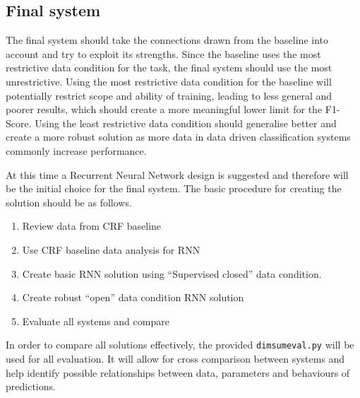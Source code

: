 \subsection{Final system}

The final system should take the connections drawn from the baseline into account and try to exploit its strengths. Since the baseline uses the most restrictive data condition for the task, the final system should use the most unrestrictive. Using the most restrictive data condition for the baseline will potentially restrict scope and ability of training, leading to less general and poorer results, which should create a more meaningful lower limit for the F1-Score. Using the least restrictive data condition should generalise better and create a more robust solution as more data in data driven classification systems commonly increase performance. 

At this time a Recurrent Neural Network design is suggested and therefore will be the initial choice for the final system. The basic procedure for creating the solution should be as follows. 

\begin{enumerate}
  \setlength{\itemsep}{0pt}
  \setlength{\parskip}{0pt}
\item Review data from CRF baseline
\item Use CRF baseline data analysis for RNN
\item Create basic RNN solution using ``Supervised closed'' data condition.
\item Create robust ``open'' data condition RNN solution
\item Evaluate all systems and compare
\end{enumerate}

In order to compare all solutions effectively, the provided \texttt{dimsumeval.py} will be used for all evaluation. It will allow for cross comparison between systems and help identify possible relationships between data, parameters and behaviours of predictions.
